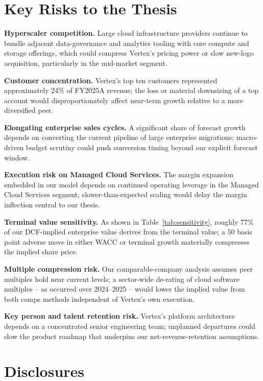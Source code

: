 \section{Key Risks to the Thesis}

\small
\begin{riskitem}
\item \textbf{Hyperscaler competition.} Large cloud infrastructure providers continue to bundle adjacent data-governance and analytics tooling with core compute and storage offerings, which could compress Vertex's pricing power or slow new-logo acquisition, particularly in the mid-market segment.
\item \textbf{Customer concentration.} Vertex's top ten customers represented approximately 24\% of FY2025A revenue; the loss or material downsizing of a top account would disproportionately affect near-term growth relative to a more diversified peer.
\item \textbf{Elongating enterprise sales cycles.} A significant share of forecast growth depends on converting the current pipeline of large enterprise migrations; macro-driven budget scrutiny could push conversion timing beyond our explicit forecast window.
\item \textbf{Execution risk on Managed Cloud Services.} The margin expansion embedded in our model depends on continued operating leverage in the Managed Cloud Services segment; slower-than-expected scaling would delay the margin inflection central to our thesis.
\item \textbf{Terminal value sensitivity.} As shown in Table~\ref{tab:sensitivity}, roughly 77\% of our DCF-implied enterprise value derives from the terminal value; a 50 basis point adverse move in either WACC or terminal growth materially compresses the implied share price.
\item \textbf{Multiple compression risk.} Our comparable-company analysis assumes peer multiples hold near current levels; a sector-wide de-rating of cloud software multiples -- as occurred over 2024--2025 -- would lower the implied value from both comps methods independent of Vertex's own execution.
\item \textbf{Key person and talent retention risk.} Vertex's platform architecture depends on a concentrated senior engineering team; unplanned departures could slow the product roadmap that underpins our net-revenue-retention assumptions.
\end{riskitem}

\section*{Disclosures}

